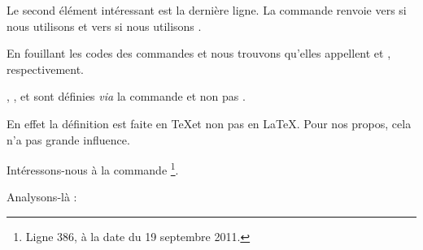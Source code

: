 Le second élément intéressant est la dernière ligne. La commande  renvoie vers  si nous utilisons  et vers  si nous utilisons .

En fouillant les codes des commandes  et  nous trouvons qu'elles appellent  et , respectivement.

\begin{plusloins}
, ,  et  sont définies \emph{via} la commande  et non pas . 

En effet la définition est faite en \TeX et non pas en \LaTeX. Pour nos propos, cela n'a pas grande influence.
\end{plusloins} 

Intéressons-nous à la commande \footnote{Ligne 386, à la date du 19 septembre 2011.}.

\begin{latexcode}
\def\@makechapterhead#1{%
  \vspace*{50\p@}%
  {\parindent \z@ \raggedright \normalfont
    \ifnum \c@secnumdepth >\m@ne
      \if@mainmatter
        \huge\bfseries \@chapapp\space \thechapter
        \par\nobreak
        \vskip 20\p@
      \fi
    \fi
    \interlinepenalty\@M
    \Huge \bfseries #1\par\nobreak
    \vskip 40\p@
  }}
\end{latexcode}

Analysons-là :


